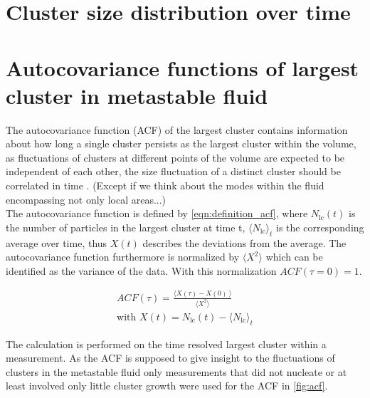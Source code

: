 \section{Cluster size distribution over time}
\label{sec:pnt}

\section{Autocovariance functions of largest cluster in metastable fluid}
\label{sec:acf}

The autocovariance function (ACF) of the largest cluster contains information about how long a single cluster persists as the largest cluster within the volume, as fluctuations of clusters at different points of the volume are expected to be independent of each other, the size fluctuation of a distinct cluster should be correlated in time . (Except if we think about the modes within the fluid encompassing not only local areas...)\\

The autocovariance function is defined by \autoref{eqn:definition_acf}, where $N_{\text{lc}}(t)$ is the number of particles in the largest cluster at time t, $\langle N_{\text{lc}} \rangle_t$ is the corresponding average over time, thus $X(t)$ describes the deviations from the average. The autocovariance function furthermore is normalized by ${ \langle X^2  \rangle }$ which can be identified as the variance of the data. With this normalization $ACF(\tau=0) = 1 $.

\begin{align}
\label{eqn:definition_acf} 
ACF(\tau)=\frac{ \langle  X(\tau)-X(0) \! \: \rangle } { \langle X^2  \rangle }\\  
\text{with } X(t)=N_{\text{lc}}(t)- \langle N_{\text{lc}} \rangle_t 
\end{align}

The calculation is performed on the time resolved largest cluster within a measurement. As the ACF is supposed to give insight to the fluctuations of clusters in the metastable fluid only measurements that did not nucleate or at least involved only little cluster growth were used for the ACF in \autoref{fig:acf}.  



